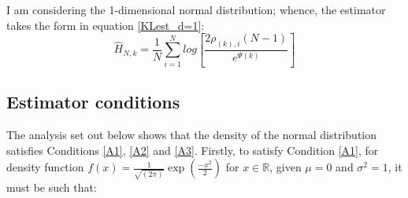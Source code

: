 \documentclass[12pt]{report}
\begin{document}
I am considering the 1-dimensional normal distribution; whence, the estimator takes the form in equation \ref{KLest_d=1}:
\begin{equation}
\hat{H}_{N, k} =  \frac{1}{N} \sum_{i=1}^{N} log \left[ \frac{2\rho_{(k),i}(N-1)}{e^{\Psi(k)}} \right]\nonumber
\end{equation}

\subsection{Estimator conditions} \label{N_conditions}

The analysis set out below shows that the density of the normal distribution satisfies Conditions \ref{A1}, \ref{A2} and \ref{A3}. Firstly, to satisfy Condition \ref{A1}, for density function $f(x) = \frac{1}{\sqrt{(2\pi)}} \exp{ \left( \frac{-x^2}{2} \right)}$ for $x \in \mathbb{R}$, given $\mu = 0$ and $\sigma^2 = 1$, it must be such that:
\end{document}

